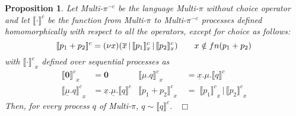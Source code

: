 \documentclass[submission,copyright,creativecommons]{eptcs}
\newcommand{\fine}{{\mbox{ }\nolinebreak\hfill{$\Box$}}}
\newcommand{\restr}[1]{\mbox{$({\bf\nu} #1)$}}
\newcommand{\para}{\mbox{$\,|\,$}}
\newcommand{\rec}[2]{\mbox{rec}\, #1.#2}
\newcommand{\encoding}[2]{\ensuremath{\llbracket #2 \rrbracket^{#1}}}
\newtheorem{aproposition}[adefinition]{Proposition}
\newenvironment{proposition}{\begin{aproposition}}{\end{aproposition}}
\begin{document}
\begin{proposition} Let Multi-$\pi^{-c}$ be the language Multi-$\pi$ without choice operator and let $\encoding c { \cdot }$ be the function from Multi-$\pi$ to Multi-$\pi^{-c}$ processes
defined homomorphically with respect to all the operators, except for choice as follows:
\[ \encoding c { p_1 + p_2 }  = \restr x ( \overline{x} \para \encoding c {p_1} _x \para \encoding c {p_2} _x ) \qquad x \notin fn(p_1 + p_2) \]
with $\encoding c { \cdot }_x$ defined over sequential processes as
\begin{align*}
\encoding c { \mathbf 0 }_x  &= \mathbf 0 \quad &
\encoding c { \mu.q }_x  &= \underline{x}.\mu.\encoding c q \quad \\
\encoding c { \underline{\mu}.q }_x  &= \underline{x}.\underline{\mu}.\encoding c q &
\encoding c { p_1 + p_2 }_x \;  &= \; \encoding c {p_1}_x \para \encoding c {p_2}_x  
\end{align*}
Then, for every process $q$ of Multi-$\pi$, $q \sim \encoding c q$.
\fine
\end{proposition}
\end{document}
